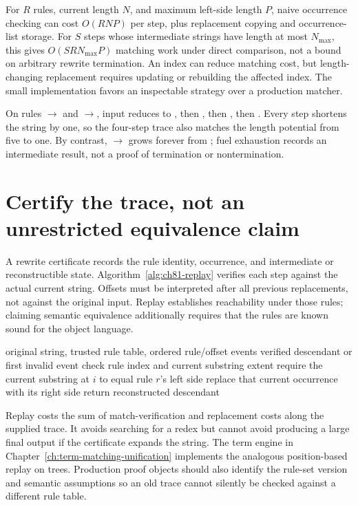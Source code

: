 For $R$ rules, current length $N$, and maximum left-side length $P$, naive occurrence checking can cost $O(RNP)$ per step, plus replacement copying and occurrence-list storage.
For $S$ steps whose intermediate strings have length at most $N_{\max}$, this gives $O(SRN_{\max}P)$ matching work under direct comparison, not a bound on arbitrary rewrite termination.
An index can reduce matching cost, but length-changing replacement requires updating or rebuilding the affected index.
The small implementation favors an inspectable strategy over a production matcher.

On rules $\to$ and $\to$, input  reduces to , then , then , then .
Every step shortens the string by one, so the four-step trace also matches the length potential from five to one.
By contrast, $\to$ grows forever from ; fuel exhaustion records an intermediate result, not a proof of termination or nontermination.

\section{Certify the trace, not an unrestricted equivalence claim}
\label{sec:ch81-certificate}
A rewrite certificate records the rule identity, occurrence, and intermediate or reconstructible state.
Algorithm~\ref{alg:ch81-replay} verifies each step against the actual current string.
Offsets must be interpreted after all previous replacements, not against the original input.
Replay establishes reachability under those rules; claiming semantic equivalence additionally requires that the rules are known sound for the object language.

\begin{algorithm}[htbp]
\caption{Replay a string-rewrite certificate against changing coordinates.}
\label{alg:ch81-replay}
\begin{pseudocode}
\Require original string, trusted rule table, ordered rule/offset events
\Ensure verified descendant or first invalid event
\State check rule index and current substring extent
\State require the current substring at $i$ to equal rule $r$'s left side
\State replace that current occurrence with its right side
\EndFor
\State return reconstructed descendant
\end{pseudocode}
\end{algorithm}

Replay costs the sum of match-verification and replacement costs along the supplied trace.
It avoids searching for a redex but cannot avoid producing a large final output if the certificate expands the string.
The term engine in Chapter~\ref{ch:term-matching-unification} implements the analogous position-based replay on trees.
Production proof objects should also identify the rule-set version and semantic assumptions so an old trace cannot silently be checked against a different rule table.

